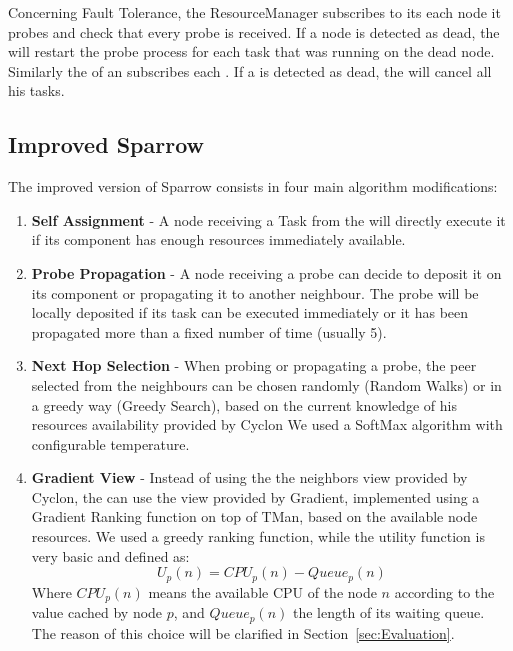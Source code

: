 \documentclass[conference]{IEEEtran}
\begin{document}
  Concerning Fault Tolerance, the ResourceManager subscribes to its
  \FailureDetector each node it probes and check that every probe is
  received. If a node is detected as dead, the \tmast will restart the
  probe process for each task that was running on the dead node. Similarly
  the \RmWorker of an \exc subscribes each \tmast. If a \tmast is detected
  as dead, the \RmWorker will cancel all his tasks.

  \subsection{Improved Sparrow}

  The improved version of Sparrow consists in four main algorithm
  modifications:
  
  \begin{enumerate}

    \item \textbf{Self Assignment} - A node receiving a Task
      from the \dc will directly execute it if its \RmWorker
      component has enough resources immediately available.

    \item \textbf{Probe Propagation} - A node receiving a probe
      can decide to deposit it on its \RmWorker component or propagating
      it to another neighbour.  The probe will be locally deposited if its
      task can be executed immediately or it has been propagated more than
      a fixed number of time (usually 5). %

    \item \textbf{Next Hop Selection} - When probing or propagating a
      probe, the peer selected from the neighbours can be chosen randomly
      (Random Walks) or in a greedy way (Greedy Search), based on the
      current knowledge of his resources availability provided by Cyclon
      We used a SoftMax algorithm with configurable temperature.

    \item \textbf{Gradient View} - Instead of using the the neighbors
      view provided by Cyclon, the \ResourceManager can use the view
      provided by Gradient, implemented using a Gradient Ranking function
      on top of TMan, based on the available node resources. We used a
      greedy ranking function, while the utility function is very basic
      and defined as:
      \[
      U_p(n) = CPU_p(n) - Queue_p(n)
      \]
      Where $CPU_p(n)$ means the available CPU of the node
      $n$ according to the value cached by node $p$, and $Queue_p(n)$ the
      length of its waiting queue. The reason of this choice will be
      clarified in Section~\ref{sec:Evaluation}.

  \end{enumerate}
\end{document}
